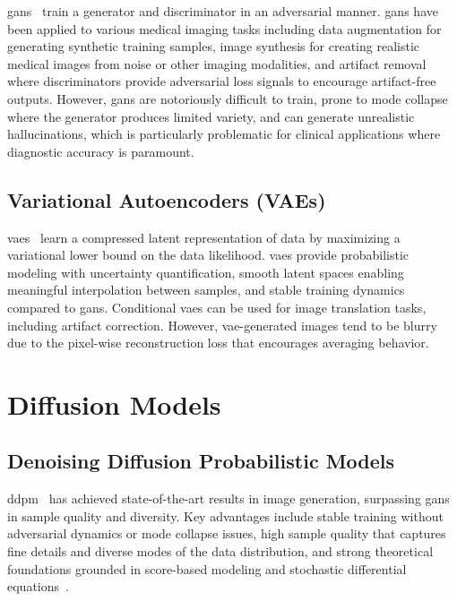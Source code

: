 \glspl{gan}~\cite{goodfellow2014generative} train a generator and discriminator in an adversarial manner. \glspl{gan} have been applied to various medical imaging tasks including data augmentation for generating synthetic training samples, image synthesis for creating realistic medical images from noise or other imaging modalities, and artifact removal where discriminators provide adversarial loss signals to encourage artifact-free outputs. However, \glspl{gan} are notoriously difficult to train, prone to mode collapse where the generator produces limited variety, and can generate unrealistic hallucinations, which is particularly problematic for clinical applications where diagnostic accuracy is paramount.

\subsection{Variational Autoencoders (VAEs)}

\glspl{vae}~\cite{kingma2013auto} learn a compressed latent representation of data by maximizing a variational lower bound on the data likelihood. \glspl{vae} provide probabilistic modeling with uncertainty quantification, smooth latent spaces enabling meaningful interpolation between samples, and stable training dynamics compared to \glspl{gan}. Conditional \glspl{vae} can be used for image translation tasks, including artifact correction. However, \gls{vae}-generated images tend to be blurry due to the pixel-wise reconstruction loss that encourages averaging behavior.

\section{Diffusion Models}

\subsection{Denoising Diffusion Probabilistic Models}

\gls{ddpm}~\cite{ho2020denoising} has achieved state-of-the-art results in image generation, surpassing \glspl{gan} in sample quality and diversity. Key advantages include stable training without adversarial dynamics or mode collapse issues, high sample quality that captures fine details and diverse modes of the data distribution, and strong theoretical foundations grounded in score-based modeling and stochastic differential equations~\cite{song2021scorebased}.

